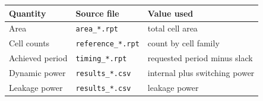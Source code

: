 \documentclass[11pt,a4paper]{article}
\begin{document}
\begin{table}[!ht]
\centering\small
\begin{tabular}{@{}lll@{}}
\toprule
\textbf{Quantity} & \textbf{Source file} & \textbf{Value used} \\
\midrule
Area & \texttt{area\_*.rpt} & total cell area \\
Cell counts & \texttt{reference\_*.rpt} & count by cell family \\
Achieved period & \texttt{timing\_*.rpt} & requested period minus slack \\
Dynamic power & \texttt{results\_*.csv} & internal plus switching power \\
Leakage power & \texttt{results\_*.csv} & leakage power \\
\bottomrule
\end{tabular}
\end{table}
\end{document}
